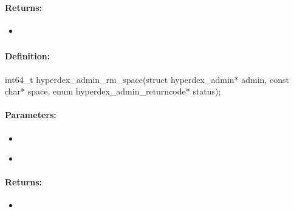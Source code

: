 \paragraph{Returns:}
\begin{itemize}[noitemsep]
\item {}\\

\end{itemize}

\pagebreak
\subsubsection{}
\label{api:c:rm_space}


\paragraph{Definition:}
\begin{ccode}
int64_t hyperdex_admin_rm_space(struct hyperdex_admin* admin,
        const char* space,
        enum hyperdex_admin_returncode* status);
\end{ccode}

\paragraph{Parameters:}
\begin{itemize}[noitemsep]
\item {}\\

\item {}\\

\end{itemize}

\paragraph{Returns:}
\begin{itemize}[noitemsep]
\item {}\\

\end{itemize}

